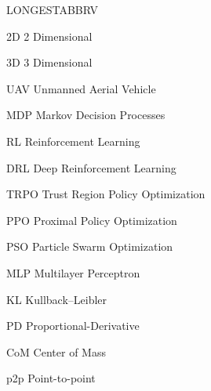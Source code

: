 \begin{theglossary}{LONGESTABBRV}

\item[2D]   2 Dimensional
\item[3D]   3 Dimensional
\item[UAV]  Unmanned Aerial Vehicle
\item[MDP]  Markov Decision Processes
\item[RL]   Reinforcement Learning
\item[DRL]  Deep Reinforcement Learning
\item[TRPO] Trust Region Policy Optimization
\item[PPO]  Proximal Policy Optimization
\item[PSO]  Particle Swarm Optimization
\item[MLP]  Multilayer Perceptron
\item[KL]   Kullback–Leibler
\item[PD]   Proportional-Derivative
\item[CoM]  Center of Mass
\item[p2p]  Point-to-point

\end{theglossary}

\newpage

